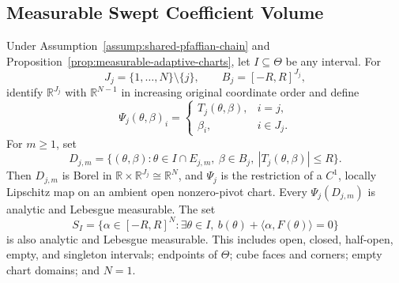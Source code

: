 \subsection{Measurable Swept Coefficient Volume}

\begin{lemma}
\label{lem:analytic-chart-events}
Under Assumption~\ref{assump:shared-pfaffian-chain} and
Proposition~\ref{prop:measurable-adaptive-charts}, let
$I\subseteq\Theta$ be any interval.  For
\[
J_j=\{1,\ldots,N\}\setminus\{j\},
\qquad B_j=[-R,R]^{J_j},
\]
identify $\mathbb R^{J_j}$ with $\mathbb R^{N-1}$ in increasing original
coordinate order and define
\[
\Psi_j(\theta,\beta)_i=
\begin{cases}
T_j(\theta,\beta),&i=j,\\
\beta_i,&i\in J_j.
\end{cases}
\tag{A8}\label{eq:a8}
\]
For $m\geq1$, set
\[
D_{j,m}=\{(\theta,\beta):
 \theta\in I\cap E_{j,m},\ \beta\in B_j,\
 |T_j(\theta,\beta)|\leq R\}.
\tag{A9}\label{eq:a9}
\]
Then $D_{j,m}$ is Borel in
$\mathbb R\times\mathbb R^{J_j}\cong\mathbb R^N$, and $\Psi_j$ is the
restriction of a $C^1$, locally Lipschitz map on an ambient open
nonzero-pivot chart.  Every $\Psi_j(D_{j,m})$ is analytic and Lebesgue
measurable.  The set
\[
S_I=\{\alpha\in[-R,R]^N:\exists\theta\in I,\
 b(\theta)+\langle\alpha,F(\theta)\rangle=0\}
\tag{A10}\label{eq:a10}
\]
is also analytic and Lebesgue measurable.  This includes open, closed,
half-open, empty, and singleton intervals; endpoints of $\Theta$; cube
faces and corners; empty chart domains; and $N=1$.
\end{lemma}


